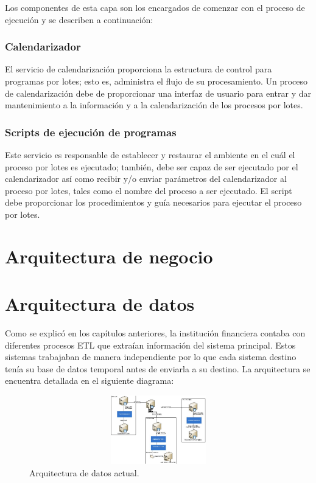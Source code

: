 Los componentes de esta capa son los encargados de comenzar con el proceso de ejecución y se describen a continuación:

\subsubsection{Calendarizador}

El servicio de calendarización proporciona la estructura de control para programas por lotes; esto es, administra el flujo de su procesamiento. Un proceso de calendarización debe de proporcionar una interfaz de usuario para entrar y dar mantenimiento a la información y a la calendarización de los procesos por lotes.

\subsubsection{Scripts de ejecución de programas}

Este servicio es responsable de establecer y restaurar el ambiente en el cuál el proceso por lotes es ejecutado; también, debe ser capaz de ser ejecutado por el calendarizador así como recibir y/o enviar parámetros del calendarizador al proceso por lotes, tales como el nombre del proceso a ser ejecutado. El script debe proporcionar los procedimientos y guía necesarios para ejecutar el proceso por lotes.

\section{Arquitectura de negocio}


\section{Arquitectura de datos}

Como se explicó en los capítulos anteriores, la institución financiera contaba
con diferentes procesos ETL que extraían información del sistema
principal. Estos sistemas trabajaban de manera independiente por lo que cada
sistema destino tenía su base de datos temporal antes de enviarla a su
destino. La arquitectura se encuentra detallada en el siguiente diagrama:

\begin{figure}[htb]
  \begin{center}
    \includegraphics[width=12cm, height=3cm, scale=0.5]{Arquitecturadatos_actual.jpg}
    \caption{Arquitectura de datos actual.}
    \label{fig:arquitectura-de-datos-actual}
  \end{center}
\end{figure}

